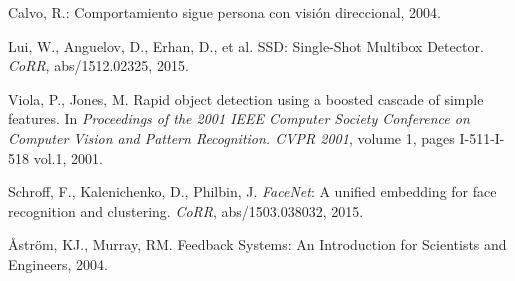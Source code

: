 \documentclass{svproc}
\begin{document}
%
\begin{thebibliography}{6}
%

Calvo, R.: Comportamiento sigue persona con visión direccional, 2004.

Lui, W., Anguelov, D., Erhan, D., et al. SSD: Single-Shot Multibox Detector. \emph{CoRR}, abs/1512.02325, 2015.

Viola, P., Jones, M. Rapid object detection using a boosted cascade of simple features. In \emph{Proceedings of the 2001 IEEE Computer Society Conference on Computer Vision and Pattern Recognition. CVPR 2001}, volume 1, pages I-511-I-518 vol.1, 2001.

Schroff, F., Kalenichenko, D., Philbin, J. \emph{FaceNet}: A unified embedding for face recognition and clustering. \emph{CoRR}, abs/1503.038032, 2015.

Åström, KJ., Murray, RM. Feedback Systems: An Introduction for Scientists and Engineers, 2004.

\end{thebibliography}
\end{document}
